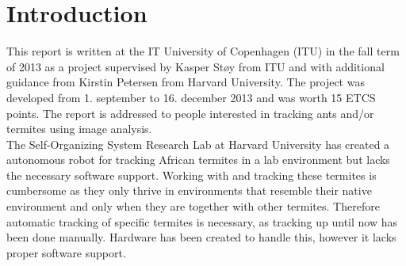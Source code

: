 
\section{Introduction}

% 
% 

This report is written at the IT University of Copenhagen (ITU) in the fall term of 2013 as a project supervised by Kasper Støy from ITU and with additional guidance from Kirstin Petersen from Harvard University. The project was developed from 1. september to 16. december 2013 and was worth 15 ETCS points. The report is addressed to people interested in tracking ants and/or termites using image analysis. \\

The Self-Organizing System Research Lab at Harvard University has created a autonomous robot for tracking African termites in a lab environment but lacks the necessary software support. Working with and tracking these termites is cumbersome as they only thrive in environments that resemble their native environment and only when they are together with other termites. Therefore automatic tracking of specific termites is necessary, as tracking up until now has been done manually. Hardware has been created to handle this, however it lacks proper software support. \\

